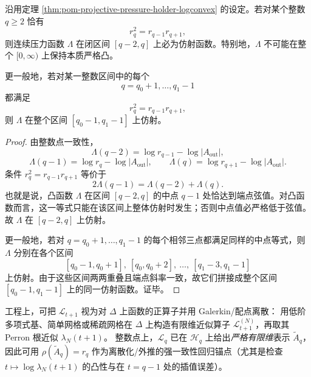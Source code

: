 \begin{theorem}[离散二阶差分塌缩强制连续压力区间仿射]\label{thm:pom-projective-pressure-discrete-flatness-forces-affine}
沿用定理 \ref{thm:pom-projective-pressure-holder-logconvex} 的设定。若对某个整数 \(q\ge 2\) 恰有
\[
\boxed{\;r_q^2=r_{q-1}r_{q+1},\;}
\]
则连续压力函数 \(\Lambda\) 在闭区间 \([q-2,q]\) 上必为仿射函数。特别地，\(\Lambda\) 不可能在整个 \([0,\infty)\) 上保持本质严格凸。

更一般地，若对某一整数区间中的每个
\[
q=q_0+1,\dots,q_1-1
\]
都满足
\[
r_q^2=r_{q-1}r_{q+1},
\]
则 \(\Lambda\) 在整个区间 \([q_0-1,q_1-1]\) 上仿射。
\end{theorem}
\begin{proof}
由整数点一致性，
\[
\Lambda(q-2)=\log r_{q-1}-\log|A_{\mathrm{out}}|,
\]
\[
\Lambda(q-1)=\log r_q-\log|A_{\mathrm{out}}|,
\qquad
\Lambda(q)=\log r_{q+1}-\log|A_{\mathrm{out}}|.
\]
条件 \(r_q^2=r_{q-1}r_{q+1}\) 等价于
\[
2\Lambda(q-1)=\Lambda(q-2)+\Lambda(q).
\]
也就是说，凸函数 \(\Lambda\) 在区间 \([q-2,q]\) 的中点 \(q-1\) 处恰达到端点弦值。对凸函数而言，这一等式只能在该区间上整体仿射时发生；否则中点值必严格低于弦值。故 \(\Lambda\) 在 \([q-2,q]\) 上仿射。

更一般地，若对 \(q=q_0+1,\dots,q_1-1\) 的每个相邻三点都满足同样的中点等式，则 \(\Lambda\) 分别在各个区间
\[
[q_0-1,q_0+1],\ [q_0,q_0+2],\ \dots,\ [q_1-3,q_1-1]
\]
上仿射。由于这些区间两两重叠且端点斜率一致，故它们拼接成整个区间 \([q_0-1,q_1-1]\) 上的同一仿射函数。证毕。
\end{proof}

\begin{remark}\label{rem:pom-projective-pressure-numerics}
工程上，可把 \(\mathcal{L}_{t+1}\) 视为对 \(\Delta\) 上函数的正算子并用 Galerkin/配点离散：
用低阶多项式基、简单网格或稀疏网格在 \(\Delta\) 上构造有限维近似算子 \(\mathcal{L}_{t+1}^{(N)}\)，再取其 Perron 根近似 \(\lambda_N(t+1)\)。
整数点上，\(\mathcal{L}_{q}\) 已在 \(\mathcal{H}_q\) 上给出\emph{严格有限维}表示 \(\widetilde A_q\)，因此可用 \(\rho(\widetilde A_q)=r_q\) 作为离散化/外推的强一致性回归锚点（尤其是检查 \(t\mapsto \log\lambda_N(t+1)\) 的凸性与在 \(t=q-1\) 处的插值误差）。
\end{remark}
